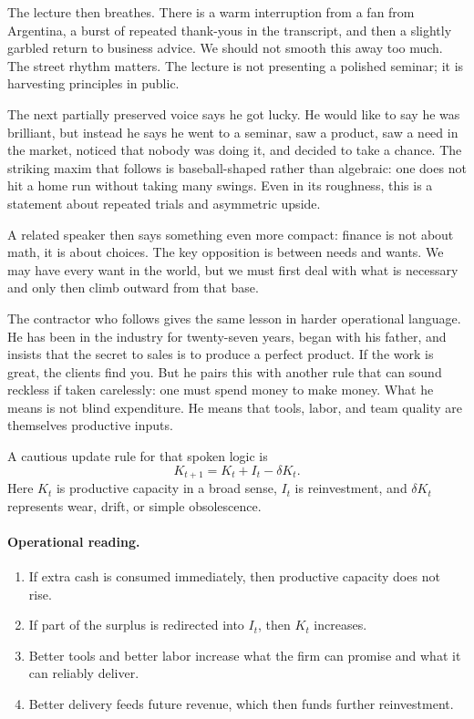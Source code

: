 The lecture then breathes. There is a warm interruption from a fan from Argentina, a burst of repeated thank-yous in the transcript, and then a slightly garbled return to business advice. We should not smooth this away too much. The street rhythm matters. The lecture is not presenting a polished seminar; it is harvesting principles in public.

The next partially preserved voice says he got lucky. He would like to say he was brilliant, but instead he says he went to a seminar, saw a product, saw a need in the market, noticed that nobody was doing it, and decided to take a chance. The striking maxim that follows is baseball-shaped rather than algebraic: one does not hit a home run without taking many swings. Even in its roughness, this is a statement about repeated trials and asymmetric upside.

A related speaker then says something even more compact: finance is not about math, it is about choices. The key opposition is between needs and wants. We may have every want in the world, but we must first deal with what is necessary and only then climb outward from that base.

The contractor who follows gives the same lesson in harder operational language. He has been in the industry for twenty-seven years, began with his father, and insists that the secret to sales is to produce a perfect product. If the work is great, the clients find you. But he pairs this with another rule that can sound reckless if taken carelessly: one must spend money to make money. What he means is not blind expenditure. He means that tools, labor, and team quality are themselves productive inputs.

A cautious update rule for that spoken logic is
\begin{equation}
K_{t+1} = K_t + I_t - \delta K_t.
\end{equation}
Here \(K_t\) is productive capacity in a broad sense, \(I_t\) is reinvestment, and \(\delta K_t\) represents wear, drift, or simple obsolescence.

\paragraph{Operational reading.}
\begin{enumerate}
\item If extra cash is consumed immediately, then productive capacity does not rise.
\item If part of the surplus is redirected into \(I_t\), then \(K_t\) increases.
\item Better tools and better labor increase what the firm can promise and what it can reliably deliver.
\item Better delivery feeds future revenue, which then funds further reinvestment.
\end{enumerate}

